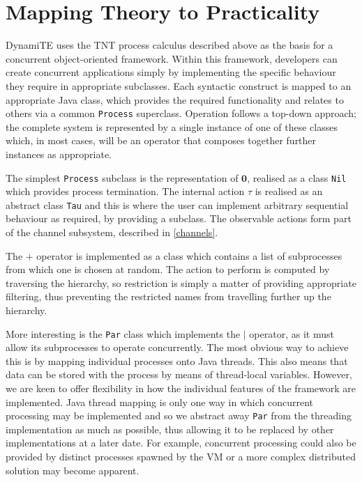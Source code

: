 \documentclass{sig-alternate}
\newcommand{\nil}{\textbf{0}}
\begin{document}
\section{Mapping Theory to Practicality}
\label{dynamite}

DynamiTE uses the TNT process calculus described above as the basis for
a concurrent object-oriented framework.  Within this framework,
developers can create concurrent applications simply by implementing the
specific behaviour they require in appropriate subclasses.  Each
syntactic construct is mapped to an appropriate Java class, which
provides the required functionality and relates to others via a common
\texttt{Process} superclass.  Operation follows a top-down approach; the
complete system is represented by a single instance of one of these
classes which, in most cases, will be an operator that composes together
further instances as appropriate.

The simplest \texttt{Process} subclass is the representation of $\nil$,
realised as a class \texttt{Nil} which provides process termination.
The internal action $\tau$ is realised as an abstract class \texttt{Tau}
and this is where the user can implement arbitrary sequential behaviour
as required, by providing a subclass. The observable actions form part
of the channel subsystem, described in \ref{channels}.

The $+$ operator is implemented as a class which contains a list of
subprocesses from which one is chosen at random.  The action to perform
is computed by traversing the hierarchy, so restriction is simply a
matter of providing appropriate filtering, thus preventing the
restricted names from travelling further up the hierarchy.

More interesting is the \texttt{Par} class which implements the $\mid$
operator, as it must allow its subprocesses to operate concurrently.
The most obvious way to achieve this is by mapping individual processes
onto Java threads.  This also means that data can be stored with the
process by means of thread-local variables.  However, we are keen to
offer flexibility in how the individual features of the framework are
implemented.  Java thread mapping is only one way in which concurrent
processing may be implemented and so we abstract away \texttt{Par} from
the threading implementation as much as possible, thus allowing it to be
replaced by other implementations at a later date.  For example,
concurrent processing could also be provided by distinct processes
spawned by the VM or a more complex distributed solution may become
apparent.
\end{document}
